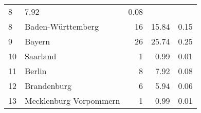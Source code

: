 \begin{longtable}{lXrrr}
       \num{8} &
       \num[round-mode=places,round-precision=2]{7.92} &
         \num[round-mode=places,round-precision=2]{0.08} \\

     8 &
     \multicolumn{1}{X}{ Baden-Württemberg   } &


       \num{16} &
       \num[round-mode=places,round-precision=2]{15.84} &
         \num[round-mode=places,round-precision=2]{0.15} \\

     9 &
     \multicolumn{1}{X}{ Bayern   } &


       \num{26} &
       \num[round-mode=places,round-precision=2]{25.74} &
         \num[round-mode=places,round-precision=2]{0.25} \\

     10 &
     \multicolumn{1}{X}{ Saarland   } &


       \num{1} &
       \num[round-mode=places,round-precision=2]{0.99} &
         \num[round-mode=places,round-precision=2]{0.01} \\

     11 &
     \multicolumn{1}{X}{ Berlin   } &


       \num{8} &
       \num[round-mode=places,round-precision=2]{7.92} &
         \num[round-mode=places,round-precision=2]{0.08} \\

     12 &
     \multicolumn{1}{X}{ Brandenburg   } &


       \num{6} &
       \num[round-mode=places,round-precision=2]{5.94} &
         \num[round-mode=places,round-precision=2]{0.06} \\

     13 &
     \multicolumn{1}{X}{ Mecklenburg-Vorpommern   } &


       \num{1} &
       \num[round-mode=places,round-precision=2]{0.99} &
         \num[round-mode=places,round-precision=2]{0.01} \\


\end{longtable}
